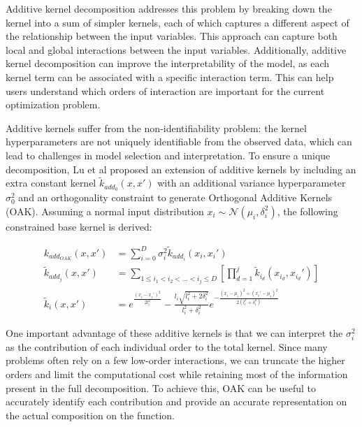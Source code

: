 \documentclass[sn-mathphys,Numbered]{sn-jnl}%
\begin{document}

Additive kernel decomposition\cite{gp-additive} addresses this problem by breaking down the kernel into a sum of simpler kernels, each of which captures a different aspect of the relationship between the input variables. This approach can capture both local and global interactions between the input variables. Additionally, additive kernel decomposition can improve the interpretability of the model, as each kernel term can be associated with a specific interaction term. This can help users understand which orders of interaction are important for the current optimization problem. 

Additive kernels suffer from the non-identifiability problem: the kernel hyperparameters are not uniquely identifiable from the observed data, which can lead to challenges in model selection and interpretation.
To ensure a unique decomposition, Lu et al\cite{gp-additive-orthogonal} proposed an extension of additive kernels by including an extra constant kernel $\tilde{k}_{add_0}(x,x')$ with an additional variance hyperparameter $\sigma_0^2$ and an orthogonality constraint to generate Orthogonal Additive Kernels (OAK)\cite{gp-additive-orthogonal}. Assuming a normal input distribution $x_i \sim \mathcal{N}(\mu_i, \delta_i^2)$, the following constrained base kernel is derived:

\begin{equation} \label{eq:additive-orthogonal}
	\begin{aligned}
		k_{add_{OAK}}(x,x') &= \sum_{i=0}^D{\sigma_i^2  \tilde{k}_{add_i}(x_i,x_i')} \\
		\tilde{k}_{add_j}(x,x') &= \sum_{1\leq i_1 < i_2 < \ldots < i_j\leq D} \left[\prod_{d=1}^{j} \tilde{k}_{i_d}(x_{i_d},x_{i_d}') \right]\\		
		\tilde{k}_i(x,x') &= e^{\frac{(x_i-x_i')^2}{2l_i^2}} - \frac{l_i\sqrt{l_i^2 + 2\delta_i^2}}{l_i^2 + \delta_i^2} e^{-\frac{(x_i-\mu_i)^2 + (x_i'-\mu_i)^2}{2(l_i^2 + \delta_i^2)}}
	\end{aligned}
\end{equation}

One important advantage of these additive kernels is that we can interpret the $\sigma_i^2$ as the contribution of each individual order to the total kernel. Since many problems often rely on a few low-order interactions, we can truncate the higher orders and limit the computational cost while retaining most of the information present in the full decomposition. To achieve this, OAK can be useful to accurately identify each contribution and provide an accurate representation on the actual composition on the function.
\end{document}
